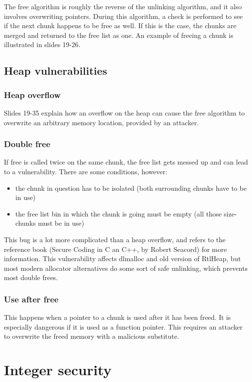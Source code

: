 \documentclass[letterpaper]{article}
\newcommand{\p}{\vspace{1em}\par}		%
\begin{document}
\p The free algorithm is roughly the reverse of the unlinking algorithm, and it also involves overwriting pointers. During this algorithm, a check is performed to see if the next chunk happens to be free as well. If this is the case, the chunks are merged and returned to the free list as one. An example of freeing a chunk is illustrated in slides 19-26.

\subsection{Heap vulnerabilities}
\subsubsection{Heap overflow}
Slides 19-35 explain how an overflow on the heap can cause the free algorithm to overwrite an arbitrary memory location, provided by an attacker.

\subsubsection{Double free}
If free is called twice on the same chunk, the free list gets messed up and can lead to a vulnerability. There are some conditions, however:
\begin{itemize}
\item the chunk in question has to be isolated (both surrounding chunks have to be in use)
\item the free list bin in which the chunk is going must be
empty (all those size-chunks must be in use)
\end{itemize}
This bug is a lot more complicated than a heap overflow, and refers to the reference book (Secure Coding in C an C++, by Robert Seacord) for more information. This vulnerability affects dlmalloc and old version of RtlHeap, but most modern allocator alternatives do some sort of safe unlinking, which prevents most double frees.

\subsubsection{Use after free}
This happens when a pointer to a chunk is used after it has been freed. It is especially dangerous if it is used as a function pointer. This requires an attacker to overwrite the freed memory with a malicious substitute.

\section{Integer security}
\end{document}
